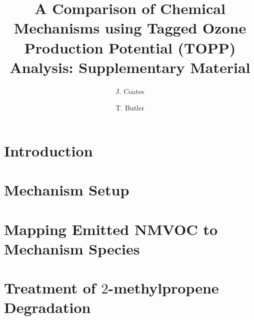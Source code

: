 \documentclass[11pt,a4paper]{article}
\title{A Comparison of Chemical Mechanisms using Tagged Ozone Production Potential (TOPP) Analysis: Supplementary Material}
\author[1]{J. Coates}%
\author[1]{T. Butler}
\affil[1]{Institute for Advanced Sustainability Studies, Potsdam, Germany}
\begin{document}
%
\section{Introduction} \label{s:introduction}

%
\section{Mechanism Setup} \label{s:mechanism}

%
\section{Mapping Emitted NMVOC to Mechanism Species}

%
\section{Treatment of $2$-methylpropene Degradation}

%
%
%
\newpage 

 
\end{document}
